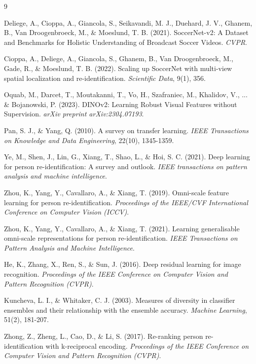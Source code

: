 \documentclass[10pt,twocolumn,letterpaper]{article}
\begin{document}
\clearpage
\begin{thebibliography}{9}

Deliege, A., Cioppa, A., Giancola, S., Seikavandi, M. J., Duehard, J. V., Ghanem, B., Van Droogenbroeck, M., \& Moeslund, T. B. (2021).
SoccerNet-v2: A Dataset and Benchmarks for Holistic Understanding of Broadcast Soccer Videos.
\textit{CVPR}.

Cioppa, A., Deliege, A., Giancola, S., Ghanem, B., Van Droogenbroeck, M., Gade, R., \& Moeslund, T. B. (2022).
Scaling up SoccerNet with multi-view spatial localization and re-identification.
\textit{Scientific Data}, 9(1), 356.

Oquab, M., Darcet, T., Moutakanni, T., Vo, H., Szafraniec, M., Khalidov, V., ... \& Bojanowski, P. (2023).
DINOv2: Learning Robust Visual Features without Supervision.
\textit{arXiv preprint arXiv:2304.07193}.

Pan, S. J., \& Yang, Q. (2010).
A survey on transfer learning.
\textit{IEEE Transactions on Knowledge and Data Engineering}, 22(10), 1345-1359.

Ye, M., Shen, J., Lin, G., Xiang, T., Shao, L., \& Hoi, S. C. (2021).
Deep learning for person re-identification: A survey and outlook.
\textit{IEEE transactions on pattern analysis and machine intelligence}.

Zhou, K., Yang, Y., Cavallaro, A., \& Xiang, T. (2019).
Omni-scale feature learning for person re-identification.
\textit{Proceedings of the IEEE/CVF International Conference on Computer Vision (ICCV)}.

Zhou, K., Yang, Y., Cavallaro, A., \& Xiang, T. (2021).
Learning generalisable omni-scale representations for person re-identification.
\textit{IEEE Transactions on Pattern Analysis and Machine Intelligence}.

He, K., Zhang, X., Ren, S., \& Sun, J. (2016).
Deep residual learning for image recognition.
\textit{Proceedings of the IEEE Conference on Computer Vision and Pattern Recognition (CVPR)}.

Kuncheva, L. I., \& Whitaker, C. J. (2003).
Measures of diversity in classifier ensembles and their relationship with the ensemble accuracy.
\textit{Machine Learning}, 51(2), 181-207.

Zhong, Z., Zheng, L., Cao, D., \& Li, S. (2017).
Re-ranking person re-identification with k-reciprocal encoding.
\textit{Proceedings of the IEEE Conference on Computer Vision and Pattern Recognition (CVPR)}.


\end{thebibliography}
\end{document}

